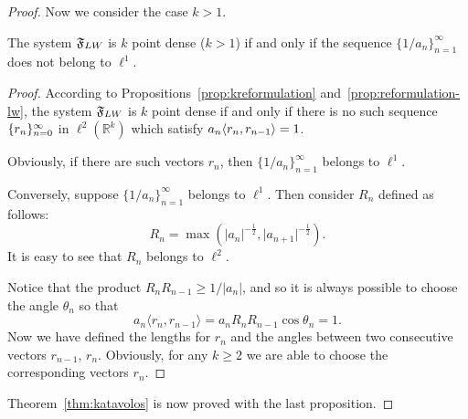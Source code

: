 \begin{proof}
    Now we consider the case $k > 1$.
    \begin{prop}
      The system $\mathfrak{F}_{LW}$ is $k$ point dense \textup($k > 1$\textup) if and only if the sequence $\{1/a_n\}_{n=1}^\infty$
        does not belong to $\ell^1$.
    \end{prop}
    \begin{proof}
      According to Propositions~\ref{prop:kreformulation} and~\ref{prop:reformulation-lw}, the system $\mathfrak{F}_{LW}$ is $k$ point dense
        if and only if there is no such sequence $\{{r}_n\}_{n=0}^\infty$ in $\ell^2(\mathbb{R}^k)$ which satisfy $a_n \langle r_n, r_{n-1} \rangle = 1$.

      Obviously, if there are such vectors $r_n$, then $\{1/a_n\}_{n=1}^\infty$ belongs to $\ell^1$.

      Conversely, suppose $\{1/a_n\}_{n=1}^\infty$ belongs to $\ell^1$.
      Then consider $R_n$ defined as follows:
      \[
        R_n = \max(\lvert a_n \rvert^{-\frac{1}{2}}, \lvert a_{n+1} \rvert^{-\frac{1}{2}}).
      \]
      It is easy to see that $R_n$ belongs to $\ell^2$.

      Notice that the product $R_nR_{n-1} \geq 1/\lvert a_n\rvert$, and so it is always possible to choose the angle $\theta_n$ so that
      \[
        a_n \langle r_n, r_{n-1} \rangle = a_n R_n R_{n-1}\cos{\theta_n} = 1.
      \]
      Now we have defined the lengths for $r_n$ and the angles between two consecutive vectors $r_{n-1}$, $r_n$.
      Obviously, for any $k \geq 2$ we are able to choose the corresponding vectors $r_n$.
    \end{proof}
    Theorem~\ref{thm:katavolos} is now proved with the last proposition.
  \end{proof}
